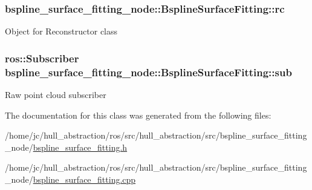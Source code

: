 \subsubsection[{\texorpdfstring{rc}{rc}}]{ bspline\+\_\+surface\+\_\+fitting\+\_\+node\+::\+Bspline\+Surface\+Fitting\+::rc\hspace{0.3cm}{\ttfamily [private]}}\hypertarget{classbspline__surface__fitting__node_1_1_bspline_surface_fitting_a37fc14202f71f41647bc78ed21a1f691}{}\label{classbspline__surface__fitting__node_1_1_bspline_surface_fitting_a37fc14202f71f41647bc78ed21a1f691}
Object for Reconstructor class 
\subsubsection[{\texorpdfstring{sub}{sub}}]{\setlength{\rightskip}{0pt plus 5cm}ros\+::\+Subscriber bspline\+\_\+surface\+\_\+fitting\+\_\+node\+::\+Bspline\+Surface\+Fitting\+::sub\hspace{0.3cm}{\ttfamily [private]}}\hypertarget{classbspline__surface__fitting__node_1_1_bspline_surface_fitting_a1ca9460f2069655ce0b55683a6622688}{}\label{classbspline__surface__fitting__node_1_1_bspline_surface_fitting_a1ca9460f2069655ce0b55683a6622688}
Raw point cloud subscriber 

The documentation for this class was generated from the following files\+:\begin{DoxyCompactItemize}
\item 
/home/jc/hull\+\_\+abstraction/ros/src/hull\+\_\+abstraction/src/bspline\+\_\+surface\+\_\+fitting\+\_\+node/\hyperlink{bspline__surface__fitting_8h}{bspline\+\_\+surface\+\_\+fitting.\+h}\item 
/home/jc/hull\+\_\+abstraction/ros/src/hull\+\_\+abstraction/src/bspline\+\_\+surface\+\_\+fitting\+\_\+node/\hyperlink{bspline__surface__fitting_8cpp}{bspline\+\_\+surface\+\_\+fitting.\+cpp}\end{DoxyCompactItemize}
